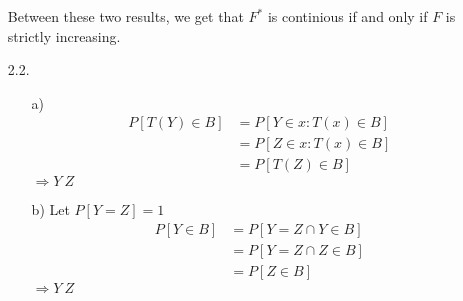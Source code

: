 \documentclass[11pt]{article}
\theoremstyle{definition}
\begin{document}
\begin{itemize}
        Between these two results, we get that $F^*$ is continious if and only if $F$ is strictly increasing.
    \item[2.2.]
        \begin{itemize}
            \item[a)]
                \begin{align*}
                    P[T(Y)\in B] &= P[Y \in {x: T(x)\in B}] \\
                                 &= P[Z \in {x: T(x)\in B}] \\
                                 &= P[T(Z) \in B]
                \end{align*}
                \( \Rightarrow Y~Z \)
            \item[b)]
                Let \(P[Y=Z]=1\)
                \begin{align*}
                    P[Y\in B] &= P[Y=Z \cap Y\in B] \\
                              &= P[Y=Z \cap Z\in B] \\
                              &= P[Z\in B]
                \end{align*}
                \( \Rightarrow Y~Z \)
        \end{itemize}
\end{itemize}


\end{document}
